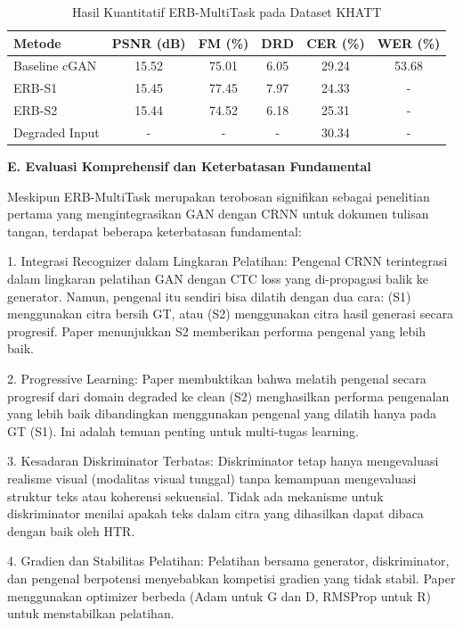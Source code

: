 \documentclass[12pt,a4paper]{book}
\begin{document}
\begin{table}[H]
\centering
\caption{Hasil Kuantitatif ERB-MultiTask pada Dataset KHATT}
\label{tab:erb-results}
\begin{tabular}{|l|c|c|c|c|c|}
\hline
\textbf{Metode} & \textbf{PSNR (dB)} & \textbf{FM (\%)} & \textbf{DRD} & \textbf{CER (\%)} & \textbf{WER (\%)} \\
\hline
Baseline cGAN & 15.52 & 75.01 & 6.05 & 29.24 & 53.68 \\
ERB-S1 & 15.45 & 77.45 & 7.97 & 24.33 & - \\
ERB-S2 & 15.44 & 74.52 & 6.18 & 25.31 & - \\
Degraded Input & - & - & - & 30.34 & - \\
\hline
\end{tabular}
\end{table}

\noindent\textbf{E. Evaluasi Komprehensif dan Keterbatasan Fundamental}

Meskipun ERB-MultiTask merupakan terobosan signifikan sebagai penelitian pertama yang mengintegrasikan GAN dengan CRNN untuk dokumen tulisan tangan, terdapat beberapa keterbatasan fundamental:

1. Integrasi Recognizer dalam Lingkaran Pelatihan:
Pengenal CRNN terintegrasi dalam lingkaran pelatihan GAN dengan CTC loss yang di-propagasi balik ke generator. Namun, pengenal itu sendiri bisa dilatih dengan dua cara: (S1) menggunakan citra bersih GT, atau (S2) menggunakan citra hasil generasi secara progresif. Paper menunjukkan S2 memberikan performa pengenal yang lebih baik.

2. Progressive Learning:
Paper membuktikan bahwa melatih pengenal secara progresif dari domain degraded ke clean (S2) menghasilkan performa pengenalan yang lebih baik dibandingkan menggunakan pengenal yang dilatih hanya pada GT (S1). Ini adalah temuan penting untuk multi-tugas learning.

3. Kesadaran Diskriminator Terbatas:
Diskriminator tetap hanya mengevaluasi realisme visual (modalitas visual tunggal) tanpa kemampuan mengevaluasi struktur teks atau koherensi sekuensial. Tidak ada mekanisme untuk diskriminator menilai apakah teks dalam citra yang dihasilkan dapat dibaca dengan baik oleh HTR.

4. Gradien dan Stabilitas Pelatihan:
Pelatihan bersama generator, diskriminator, dan pengenal berpotensi menyebabkan kompetisi gradien yang tidak stabil. Paper menggunakan optimizer berbeda (Adam untuk G dan D, RMSProp untuk R) untuk menstabilkan pelatihan.
\end{document}
